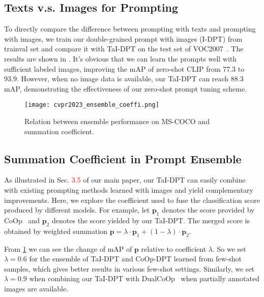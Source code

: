\documentclass[10pt,twocolumn,letterpaper]{article}
\begin{document}
\subsection{Texts v.s. Images for Prompting}
\label{sec:tai_supp}
To directly compare the difference between prompting with texts and prompting with images, we train our double-grained prompt with images (I-DPT) from trainval set and compare it with TaI-DPT on the test set of VOC2007~\cite{voc2007}. The results are shown in . It's obvious that we can learn the prompts well with sufficient labeled images, improving the mAP of zero-shot CLIP from 77.3 to 93.9. However, when no image data is available, our TaI-DPT can reach 88.3 mAP, demonstrating the effectiveness of our zero-shot prompt tuning scheme.



\begin{figure}
  \centering
\texttt{[image: cvpr2023\_ensemble\_coeffi.png]}
  \vspace{-3mm}
  \caption{Relation between ensemble performance on MS-COCO and summation coefficient.}
  \label{fig:ensemble_coeffi}
\end{figure}

\subsection{Summation Coefficient in Prompt Ensemble}
\label{sec:ensemble_supp}
As illustrated in Sec. \textcolor{red}{3.5} of our main paper, our TaI-DPT can easily combine with existing prompting methods learned with images and yield complementary improvements. Here, we explore the coefficient used to fuse the classification score produced by different models. For example, let $\boldsymbol p_1$ denotes the score provided by CoOp~\cite{coop} and $\boldsymbol p_2$ denotes the score yielded by our TaI-DPT. The merged score is obtained by weighted summation $\boldsymbol p = \lambda \cdot \boldsymbol p_1 + (1 - \lambda ) \cdot \boldsymbol p_2$. 

From \cref{fig:ensemble_coeffi} we can see the change of mAP of $\boldsymbol p$ relative to coefficient $\lambda$.
So we set $\lambda = 0.6$ for the ensemble of TaI-DPT and CoOp-DPT learned from few-shot samples, which gives better results in various few-shot settings. Similarly, we set $\lambda = 0.9$ when combining our TaI-DPT with DualCoOp~\cite{dualcoop} when partially annotated images are available.
\end{document}
